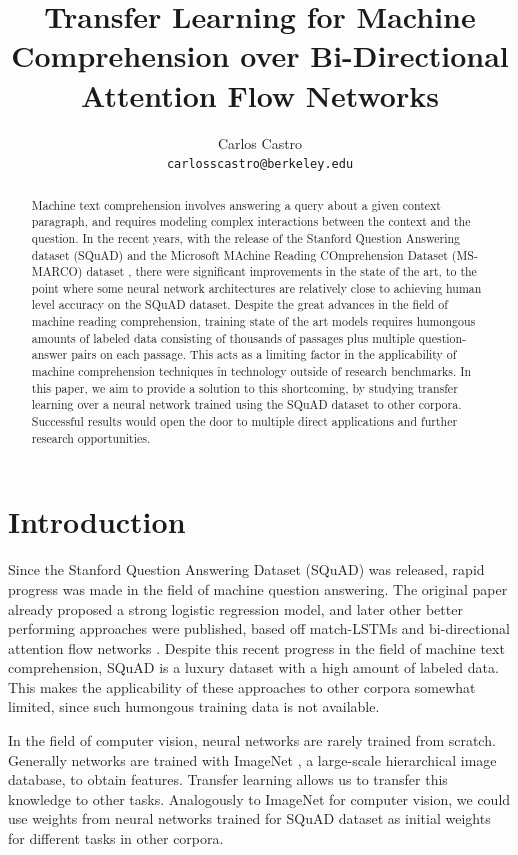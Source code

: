 \documentclass[11pt,a4paper]{article}
\title{Transfer Learning for Machine Comprehension over Bi-Directional Attention Flow Networks}
\author{Carlos Castro \\
  {\tt carlosscastro@berkeley.edu} }
\date{}
\begin{document}
\maketitle
\begin{abstract}

Machine text comprehension involves answering a query about a given context paragraph, and requires modeling complex interactions between the context and the question. In the recent years, with the release of the  Stanford Question Answering dataset (SQuAD) \cite{squad:2016} and the Microsoft MAchine Reading COmprehension Dataset (MS-MARCO) dataset \cite{msmarco:2016}, there were significant improvements in the state of the art, to the point where some neural network architectures are relatively close to achieving human level accuracy on the SQuAD dataset. Despite the great advances in the field of machine reading comprehension, training state of the art models requires humongous amounts of labeled data consisting of thousands of passages plus multiple question-answer pairs on each passage. This acts as a limiting factor in the applicability of machine comprehension techniques in technology outside of research benchmarks. In this paper, we aim to provide a solution to this shortcoming, by studying transfer learning over a neural network trained using the SQuAD dataset to other corpora. Successful results would open the door to multiple direct applications and further research opportunities.

\end{abstract}


\section{Introduction}

Since the Stanford Question Answering Dataset (SQuAD) \cite{squad:2016} was released, rapid progress was made in the field of machine question answering. The original paper already proposed a strong logistic regression model, and later other better performing approaches were published, based off match-LSTMs \cite{matchlstm} and bi-directional attention flow networks \cite{bidaf:2017}. Despite this recent progress in the field of machine text comprehension, SQuAD is a luxury dataset with a high amount of labeled data. This makes the applicability of these approaches to other corpora somewhat limited, since such humongous training data is not available. 

In the field of computer vision, neural networks are rarely trained from scratch. Generally networks are trained with ImageNet \cite{imagenet}, a large-scale hierarchical image database, to obtain features. Transfer learning allows us to transfer this knowledge to other tasks. Analogously to ImageNet for computer vision, we could use weights from neural networks trained for SQuAD dataset as initial weights for different tasks in other corpora. 
\end{document}
